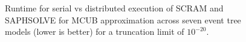 \begin{figure}[]
  \centering
  
  \caption{Runtime for serial vs distributed execution of SCRAM and SAPHSOLVE for MCUB approximation across seven event tree models (lower is better) for a truncation limit of $10^{-20}$.}
  \label{fig:distributed_mcub_runtime_1e20}
\end{figure}